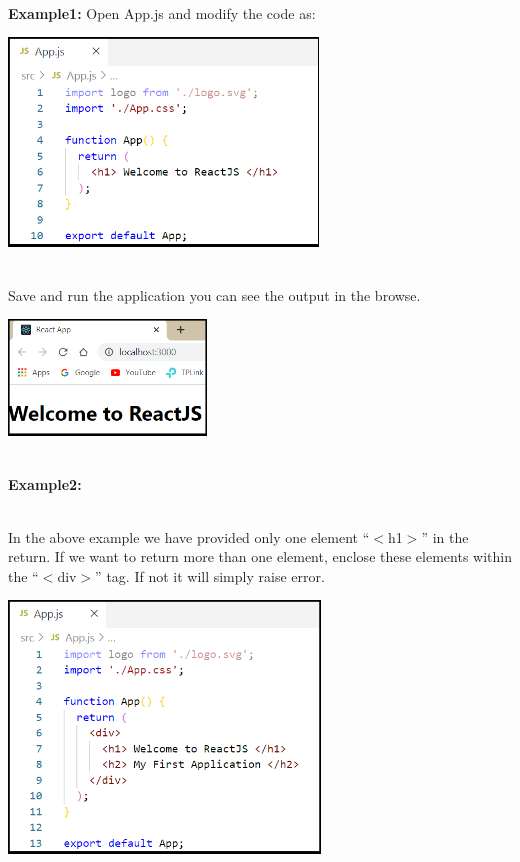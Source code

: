 \documentclass{article}
\begin{document}
\noindent\\
 \textbf{Example1: }Open App.js and modify the code as:

\begin{center}
	\noindent \includegraphics*[width=3.24in, height=2.19in]{IMG-07-12}
\end{center}

\noindent 

\noindent\\
 Save and run the application you can see the output in the browse.

\noindent 

\begin{center}
	\noindent \includegraphics*[width=2.07in, height=1.22in]{IMG-07-13}
\end{center}

\noindent 

\noindent\\
 \textbf{Example2:}

\noindent\\
 In the above example we have provided only one element ``$\mathrm{<}$h1$\mathrm{>}$'' in the return. If we want to return more than one element, enclose these elements within the ``$\mathrm{<}$div$\mathrm{>}$'' tag. If not it will simply raise error.

\begin{center}
	\noindent \includegraphics*[width=3.27in, height=2.64in]{IMG-07-14}
\end{center}
\end{document}
